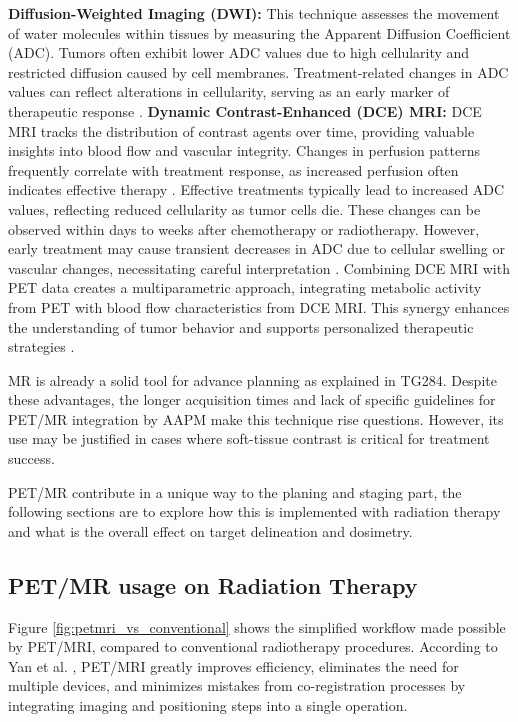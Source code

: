 \documentclass[11pt]{article} %
\begin{document}
\begin{multicols}{2}
\textbf{Diffusion-Weighted Imaging (DWI):} This technique assesses the movement of water molecules within tissues by measuring the Apparent Diffusion Coefficient (ADC). Tumors often exhibit lower ADC values due to high cellularity and restricted diffusion caused by cell membranes. Treatment-related changes in ADC values can reflect alterations in cellularity, serving as an early marker of therapeutic response \cite{pmc2010, ajr2006}.
\textbf{Dynamic Contrast-Enhanced (DCE) MRI:} DCE MRI tracks the distribution of contrast agents over time, providing valuable insights into blood flow and vascular integrity. Changes in perfusion patterns frequently correlate with treatment response, as increased perfusion often indicates effective therapy \cite{academic2021}.
Effective treatments typically lead to increased ADC values, reflecting reduced cellularity as tumor cells die. These changes can be observed within days to weeks after chemotherapy or radiotherapy. However, early treatment may cause transient decreases in ADC due to cellular swelling or vascular changes, necessitating careful interpretation \cite{pmc2010, pmc2009}.
Combining DCE MRI with PET data creates a multiparametric approach, integrating metabolic activity from PET with blood flow characteristics from DCE MRI. This synergy enhances the understanding of tumor behavior and supports personalized therapeutic strategies \cite{frontiers2020, springer2024}.

MR is already a solid tool for advance planning as explained in TG284\cite{TG284}. Despite these advantages, the longer acquisition times and lack of specific guidelines for PET/MR integration by AAPM make this technique rise questions. However, its use may be justified in cases where soft-tissue contrast is critical for treatment success. 

PET/MR contribute in a unique way to the planing and staging part, the following sections are to explore how this is implemented with radiation therapy and what is the overall effect on target delineation and dosimetry.

\end{multicols}

\subsection{PET/MR usage on Radiation Therapy}

Figure \ref{fig:petmri_vs_conventional} shows the simplified workflow made possible by PET/MRI, compared to conventional radiotherapy procedures. According to Yan et al. \cite{yan2024}, PET/MRI greatly improves efficiency, eliminates the need for multiple devices, and minimizes mistakes from co-registration processes by integrating imaging and positioning steps into a single operation.
\end{document}

